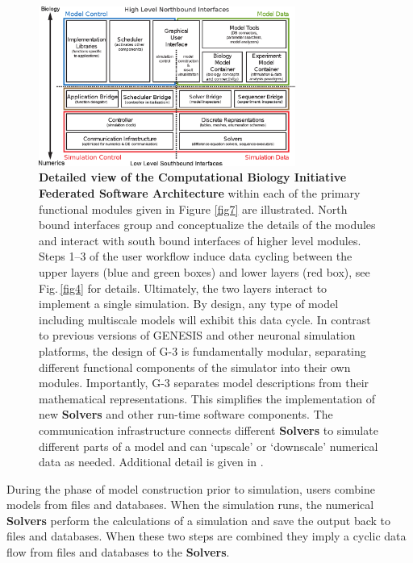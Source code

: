 \documentclass[10pt,letterpaper]{article}
\begin{document}
\begin{figure}[h!t]
  \begin{center}
    \includegraphics[width=0.75\textwidth]{figures/cbi-architecture-expanded.eps}
  \end{center}
  \caption{{\small{\bf Detailed view of the Computational Biology Initiative Federated Software Architecture} within each of the primary functional modules given in Figure \ref{fig7} are illustrated.  North bound interfaces group and conceptualize the details of the modules and interact with south bound interfaces of higher level modules.  Steps 1--3 of the user workflow induce data cycling between the upper layers (blue and green boxes) and lower layers (red box), see Fig.\,\ref{fig4} for details. Ultimately, the two layers interact to implement a single simulation. By design, any type of model including multiscale models will exhibit this data cycle. In contrast to previous versions of GENESIS and other neuronal simulation platforms, the design of G-3 is fundamentally modular, separating different functional components of the simulator into their own modules. Importantly, G-3 separates model descriptions from their mathematical representations.  This simplifies the implementation of new {\bf Solvers} and other run-time software components. The communication infrastructure connects different {\bf Solvers} to simulate different parts of a model and can `upscale' or `downscale' numerical data as needed. Additional detail is given in \cite{cornelis12}.}}
  \label{fig8}
\end{figure}

During the phase of model construction prior to simulation, users combine models from files and databases.  When the simulation runs, the numerical {\bf Solvers} perform the calculations of a simulation and save the output back to files and databases.  When these two steps are combined they imply a cyclic data flow from files and databases to the {\bf Solvers}.
\end{document}
